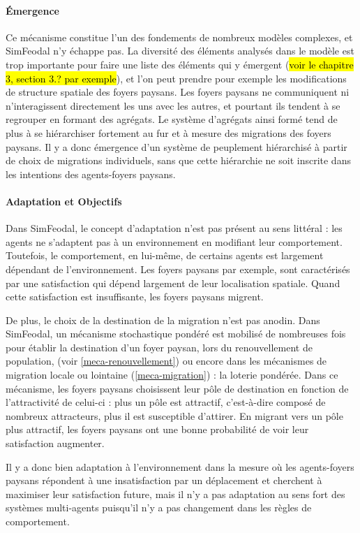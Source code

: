 \paragraph{Émergence} Ce mécanisme constitue l'un des fondements de nombreux modèles complexes, et SimFeodal n'y échappe pas.
La diversité des éléments analysés dans le modèle est trop importante pour faire une liste des éléments qui y émergent (\hl{voir le chapitre 3, section 3.? par exemple}), et l'on peut prendre pour exemple les modifications de structure spatiale des foyers paysans.
Les foyers paysans ne communiquent ni n'interagissent directement les uns avec les autres, et pourtant ils tendent à se regrouper en formant des agrégats.
Le système d'agrégats ainsi formé tend de plus à se hiérarchiser fortement au fur et à mesure des migrations des foyers paysans.
Il y a donc émergence d'un système de peuplement hiérarchisé à partir de choix de migrations individuels, sans que cette hiérarchie ne soit inscrite dans les intentions des agents-foyers paysans.

\paragraph{Adaptation et Objectifs} Dans SimFeodal, le concept d'adaptation n'est pas présent au sens littéral : les agents ne s'adaptent pas à un environnement en modifiant leur comportement.
Toutefois, le comportement, en lui-même, de certains agents est largement dépendant de l'environnement.
Les foyers paysans par exemple, sont caractérisés par une satisfaction qui dépend largement de leur localisation spatiale.
Quand cette satisfaction est insuffisante, les foyers paysans migrent.

De plus, le choix de la destination de la migration n'est pas anodin.
Dans SimFeodal, un mécanisme stochastique pondéré est mobilisé de nombreuses fois pour établir la destination d'un foyer paysan, lors du renouvellement de population, (voir \cref{meca-renouvellement}) ou encore dans les mécanismes de migration locale ou lointaine (\cref{meca-migration}) : 
la \og loterie pondérée\fg{}.
Dans ce mécanisme, les foyers paysans \og choisissent\fg{} leur pôle de destination en fonction de l'attractivité de celui-ci :
plus un pôle est attractif, c'est-à-dire composé de nombreux attracteurs, plus il est susceptible d'attirer.
En migrant vers un pôle plus attractif, les foyers paysans ont une bonne probabilité de voir leur satisfaction augmenter.

Il y a donc bien adaptation à l'environnement dans la mesure où les agents-foyers paysans répondent à une insatisfaction par un déplacement et cherchent à maximiser leur satisfaction future, mais il n'y a pas adaptation au sens fort des systèmes multi-agents puisqu'il n'y a pas changement dans les règles de comportement.

